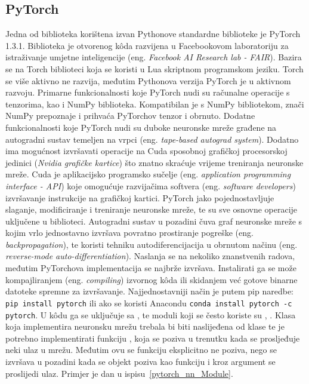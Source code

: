 \subsection{PyTorch}
Jedna od biblioteka korištena izvan Pythonove standardne biblioteke je PyTorch 1.3.1. Biblioteka je otvorenog k\^oda razvijena u Facebookovom laboratoriju za istraživanje umjetne inteligencije  (eng. \textit{Facebook AI Research lab - FAIR}). Bazira se na Torch biblioteci koja se koristi u Lua skriptnom programskom jeziku. Torch se više aktivno ne razvija, međutim Pythonova verzija PyTorch je u aktivnom razvoju. Primarne funkcionalnosti koje PyTorch nudi su računalne operacije s tenzorima, kao i NumPy biblioteka. Kompatibilan je s NumPy bibliotekom, znači NumPy prepoznaje i prihvaća PyTorchov tenzor i obrnuto. Dodatne funkcionalnosti koje PyTorch nudi su duboke neuronske mreže građene na autogradni sustav temeljen na vrpci (eng. \textit{tape-based autograd system}). Dodatno ima mogućnost izvršavati operacije na Cuda sposobnoj grafičkoj procesorskoj jedinici (\emph{Nvidia grafičke kartice}) što znatno skraćuje vrijeme treniranja neuronske mreže. Cuda je aplikacijsko programsko sučelje (eng. \textit{application programming interface - API}) koje omogućuje razvijačima softvera (eng. \textit{software developers}) izvršavanje instrukcije na grafičkoj kartici. PyTorch jako pojednostavljuje slaganje, modificiranje i treniranje neuronske mreže, te su sve osnovne operacije uključene u biblioteci. Autogradni sustav u pozadini čuva graf neuronske mreže s kojim vrlo jednostavno izvršava povratno prostiranje pogreške (eng. \textit{backpropagation}), te koristi tehniku autodiferencijacija u obrnutom načinu (eng. \textit{reverse-mode auto-differentiation}). Naslanja se na nekoliko znanstvenih radova, međutim PyTorchova implementacija se najbrže izvršava. Instalirati ga se može kompajliranjem (eng. \textit{compiling}) izvornog k\^oda ili skidanjem već gotove binarne datoteke spremne za izvršavanje. Najjednostavniji način je putem pip naredbe: \lstinline$pip install pytorch$ ili ako se koristi Anacondu \lstinline$conda install pytorch -c pytorch$. U k\^odu ga se uključuje sa , te moduli koji se često koriste su , . Klasa koja implementira neuronsku mrežu trebala bi biti naslijeđena od klase  te je potrebno implementirati funkciju , koja se poziva u trenutku kada se prosljeđuje neki ulaz u mrežu. Međutim ovu se funkciju eksplicitno ne poziva, nego se izvršava u pozadini kada se objekt poziva kao funkciju i kroz argument se proslijedi ulaz. Primjer je dan u ispisu~\ref{pytorch_nn_Module}.
{}

